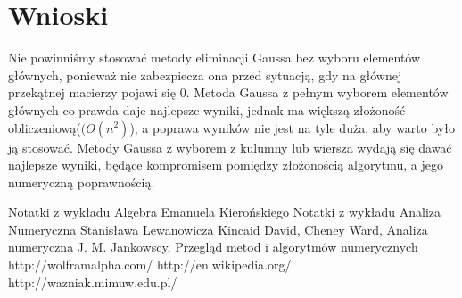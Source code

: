 \documentclass[a4paper,10pt]{article}
\begin{document}
\section{Wnioski}
    Nie powinniśmy stosować metody eliminacji Gaussa bez wyboru elementów głównych, ponieważ nie zabezpiecza ona przed sytuacją, gdy na głównej przekątnej macierzy pojawi się $0$.
    Metoda Gaussa z pełnym wyborem elementów głównych co prawda daje najlepsze wyniki, jednak ma większą złożoność obliczeniową($(O(n^2)$), a poprawa wyników nie jest na tyle duża, aby warto było ją stosować.
    Metody Gaussa z wyborem z kulumny lub wiersza wydają się dawać najlepsze wyniki, będące kompromisem pomiędzy złożonością algorytmu, a jego numeryczną poprawnością.

	
\begin{thebibliography}{9}
	 Notatki z wykładu Algebra Emanuela Kierońskiego
	 Notatki z wykładu Analiza Numeryczna Stanisława Lewanowicza
	 Kincaid David, Cheney Ward, Analiza numeryczna
	 J. M. Jankowscy, Przegląd metod i algorytmów numerycznych
	 http://wolframalpha.com/
	 http://en.wikipedia.org/
	 http://wazniak.mimuw.edu.pl/
\end{thebibliography}
\end{document}
